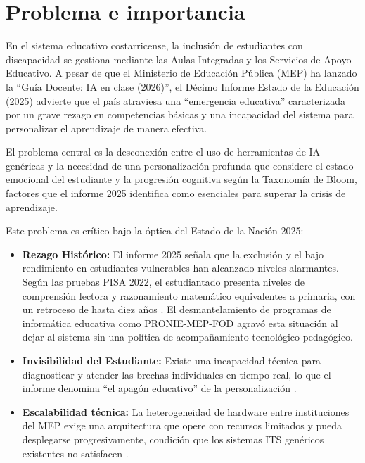 \section{Problema e importancia}
En el sistema educativo costarricense, la inclusi\'on de estudiantes con
discapacidad se gestiona mediante las Aulas Integradas y los Servicios de
Apoyo Educativo. A pesar de que el Ministerio de Educaci\'on P\'ublica (MEP)
ha lanzado la ``Gu\'ia Docente: IA en clase (2026)'', el D\'ecimo Informe
Estado de la Educaci\'on (2025)\cite{PEN2025} advierte que el pa\'is
atraviesa una ``emergencia educativa'' caracterizada por un grave rezago en
competencias b\'asicas y una incapacidad del sistema para personalizar el
aprendizaje de manera efectiva.

El problema central es la desconexi\'on entre el uso de herramientas de IA
gen\'ericas y la necesidad de una personalizaci\'on profunda que considere
el estado emocional del estudiante y la progresi\'on cognitiva seg\'un la
Taxonom\'ia de Bloom, factores que el informe 2025 identifica como
esenciales para superar la crisis de aprendizaje.

Este problema es cr\'itico bajo la \'optica del Estado de la Naci\'on 2025:

\begin{itemize}
    \item \textbf{Rezago Hist\'orico:} El informe 2025 se\~nala que la
    exclusi\'on y el bajo rendimiento en estudiantes vulnerables han
    alcanzado niveles alarmantes. Seg\'un las pruebas PISA 2022, el
    estudiantado presenta niveles de comprensi\'on lectora y razonamiento
    matem\'atico equivalentes a primaria, con un retroceso de hasta diez
    a\~nos \cite{PEN2025}. El desmantelamiento de programas de inform\'atica
    educativa como PRONIE-MEP-FOD agrav\'o esta situaci\'on al dejar al
    sistema sin una pol\'itica de acompa\~namiento tecnol\'ogico
    pedag\'ogico.

    \item \textbf{Invisibilidad del Estudiante:} Existe una incapacidad
    t\'ecnica para diagnosticar y atender las brechas individuales en tiempo
    real, lo que el informe denomina ``el apag\'on educativo'' de la
    personalizaci\'on \cite{PEN2025}.

    \item \textbf{Escalabilidad t\'ecnica:} La heterogeneidad de hardware
    entre instituciones del MEP exige una arquitectura que opere con recursos
    limitados y pueda desplegarse progresivamente, condici\'on que los
    sistemas ITS gen\'ericos existentes no satisfacen \cite{PEN2025}.
\end{itemize}
